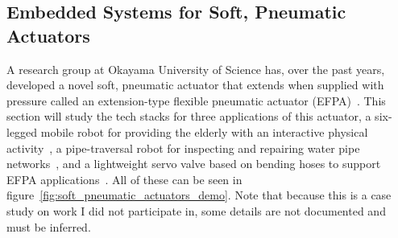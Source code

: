 \documentclass[english,12pt,a4paper,pdftex,eng,utf8]{aaltothesis}
\begin{document}
\subsection{Embedded Systems for Soft, Pneumatic Actuators}

A research group at Okayama University of Science has, over the past years, developed a novel soft, pneumatic actuator that extends when supplied with pressure called an extension-type flexible pneumatic actuator (EFPA)~\cite{Noritsugu2005}. This section will study the tech stacks for three applications of this actuator, a six-legged mobile robot for providing the elderly with an interactive physical activity~\cite{Hase2020}, a pipe-traversal robot for inspecting and repairing water pipe networks~\cite{Shinohara2020}, and a lightweight servo valve based on bending hoses to support EFPA applications~\cite{Kobayashi2020}. All of these can be seen in figure~\ref{fig:soft_pneumatic_actuators_demo}. Note that because this is a case study on work I did not participate in, some details are not documented and must be inferred.
\end{document}
